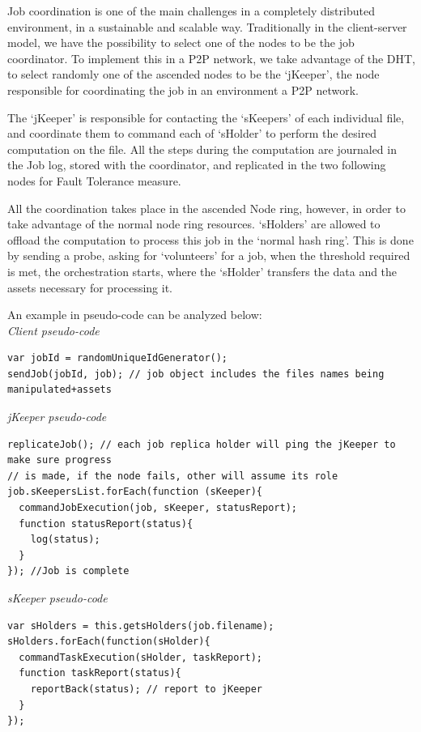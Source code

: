 Job coordination is one of the main challenges in a completely distributed environment, in a sustainable and scalable way. Traditionally in the client-server model, we have the possibility to select one of the nodes to be the job coordinator. To implement this in a P2P network, we take advantage of the DHT, to select randomly one of the ascended nodes to be the `jKeeper', the node responsible for coordinating the job in an environment a P2P network.

The `jKeeper' is responsible for contacting the `sKeepers' of each individual file, and coordinate them to command each of `sHolder' to perform the desired computation on the file. All the steps during the computation are journaled in the Job log, stored with the coordinator, and replicated in the two following nodes for Fault Tolerance measure.

All the coordination takes place in the ascended Node ring, however, in order to take advantage of the normal node ring resources. `sHolders' are allowed to offload the computation to process this job in the `normal hash ring'. This is done by sending a probe, asking for `volunteers' for a job, when the threshold required is met, the orchestration starts, where the `sHolder' transfers the data and the assets necessary for processing it.

An example in pseudo-code can be analyzed below: \\

\textit{Client pseudo-code}
\begingroup
\scriptsize
\begin{verbatim}
var jobId = randomUniqueIdGenerator();
sendJob(jobId, job); // job object includes the files names being manipulated+assets
\end{verbatim}  
\endgroup



\textit{jKeeper pseudo-code}
\begingroup
\scriptsize
\begin{verbatim}
replicateJob(); // each job replica holder will ping the jKeeper to make sure progress 
// is made, if the node fails, other will assume its role
job.sKeepersList.forEach(function (sKeeper){
  commandJobExecution(job, sKeeper, statusReport);
  function statusReport(status){
    log(status);
  }  
}); //Job is complete
\end{verbatim}
\endgroup

\textit{sKeeper pseudo-code}
\begingroup
\scriptsize
\begin{verbatim}
var sHolders = this.getsHolders(job.filename);
sHolders.forEach(function(sHolder){
  commandTaskExecution(sHolder, taskReport);
  function taskReport(status){
    reportBack(status); // report to jKeeper
  }
});
\end{verbatim}
\endgroup

